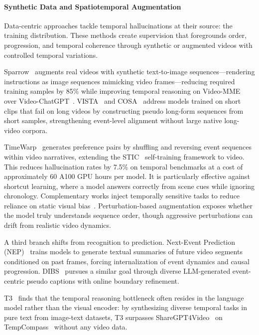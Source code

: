 \documentclass[10pt]{article} %
\begin{document}
\paragraph{Synthetic Data and Spatiotemporal Augmentation}

Data-centric approaches tackle temporal hallucinations at their source: the training distribution. These methods create supervision that foregrounds order, progression, and temporal coherence through synthetic or augmented videos with controlled temporal variations.

Sparrow~\citep{Yin2024SparrowDV} augments real videos with synthetic text-to-image sequences---rendering instructions as image sequences mimicking video frames---reducing required training samples by 85\% while improving temporal reasoning on Video-MME over Video-ChatGPT~\citep{Maaz2023VideoChatGPTTD}. VISTA~\citep{Ren2024VISTAEL} and COSA~\citep{Chen2023COSACS} address models trained on short clips that fail on long videos by constructing pseudo long-form sequences from short samples, strengthening event-level alignment without large native long-video corpora.

TimeWarp~\citep{Vani2025HarnessingSP} generates preference pairs by shuffling and reversing event sequences within video narratives, extending the STIC~\citep{deng2024enhancing} self-training framework to video. This reduces hallucination rates by 7.5\% on temporal benchmarks at a cost of approximately 60 A100 GPU hours per model. It is particularly effective against shortcut learning, where a model answers correctly from scene cues while ignoring chronology. Complementary works inject temporally sensitive tasks to reduce reliance on static visual bias~\citep{Wang2025TIMETM, Zhou2025StreferEV}. Perturbation-based augmentation exposes whether the model truly understands sequence order, though aggressive perturbations can drift from realistic video dynamics.

A third branch shifts from recognition to prediction. Next-Event Prediction (NEP)~\citep{Wang2025FosteringVR} trains models to generate textual summaries of future video segments conditioned on past frames, forcing internalization of event dynamics and causal progression. DIBS~\citep{Wu2024DIBSED} pursues a similar goal through diverse LLM-generated event-centric pseudo captions with online boundary refinement.

T3~\citep{Li2024TemporalRT} finds that the temporal reasoning bottleneck often resides in the language model rather than the visual encoder: by synthesizing diverse temporal tasks in pure text from image-text datasets, T3 surpasses ShareGPT4Video~\citep{Chen2024ShareGPT4VideoIV} on TempCompass~\citep{liu2024tempcompass} without any video data.
\end{document}
